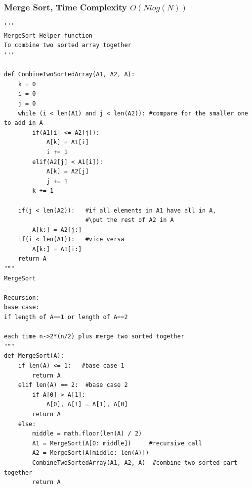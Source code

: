 \documentclass{article}
\begin{document}
\subsubsection*{Merge Sort, Time Complexity $O(Nlog(N))$}
\begin{lstlisting}[style = py]
'''
MergeSort Helper function
To combine two sorted array together
'''

def CombineTwoSortedArray(A1, A2, A):
    k = 0
    i = 0
    j = 0
    while (i < len(A1) and j < len(A2)): #compare for the smaller one to add in A
        if(A1[i] <= A2[j]):
            A[k] = A1[i]
            i += 1
        elif(A2[j] < A1[i]):
            A[k] = A2[j]
            j += 1
        k += 1

    if(j < len(A2)):   #if all elements in A1 have all in A, 
                       #\put the rest of A2 in A
        A[k:] = A2[j:]
    if(i < len(A1)):   #vice versa
        A[k:] = A1[i:]
    return A
"""
MergeSort

Recursion:
base case:
if length of A==1 or length of A==2

each time n->2*(n/2) plus merge two sorted together
"""
def MergeSort(A):
    if len(A) <= 1:   #base case 1
        return A
    elif len(A) == 2:  #base case 2
        if A[0] > A[1]:
            A[0], A[1] = A[1], A[0]
        return A
    else:
        middle = math.floor(len(A) / 2)  
        A1 = MergeSort(A[0: middle])     #recursive call
        A2 = MergeSort(A[middle: len(A)])
        CombineTwoSortedArray(A1, A2, A)  #combine two sorted part together
        return A



\end{lstlisting}
\end{document}
